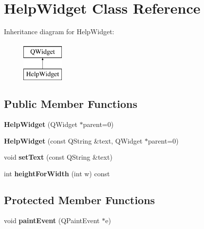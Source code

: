 \hypertarget{class_help_widget}{\section{Help\-Widget Class Reference}
\label{class_help_widget}
}
Inheritance diagram for Help\-Widget\-:\begin{figure}[H]
\begin{center}
\leavevmode
\includegraphics[height=2.000000cm]{class_help_widget}
\end{center}
\end{figure}
\subsection*{Public Member Functions}
\begin{DoxyCompactItemize}
\item 
\hypertarget{class_help_widget_a67b4d660d58cf90ed1d585cce098c910}{{\bfseries Help\-Widget} (Q\-Widget $\ast$parent=0)}\label{class_help_widget_a67b4d660d58cf90ed1d585cce098c910}

\item 
\hypertarget{class_help_widget_a119c4cf249d87bc0280a240d93d10f96}{{\bfseries Help\-Widget} (const Q\-String \&text, Q\-Widget $\ast$parent=0)}\label{class_help_widget_a119c4cf249d87bc0280a240d93d10f96}

\item 
\hypertarget{class_help_widget_a37dd017ab8543bf1a0e2140240d0ad6e}{void {\bfseries set\-Text} (const Q\-String \&text)}\label{class_help_widget_a37dd017ab8543bf1a0e2140240d0ad6e}

\item 
\hypertarget{class_help_widget_aefb13a32d45102f34c4dd7fc10945d59}{int {\bfseries height\-For\-Width} (int w) const }\label{class_help_widget_aefb13a32d45102f34c4dd7fc10945d59}

\end{DoxyCompactItemize}
\subsection*{Protected Member Functions}
\begin{DoxyCompactItemize}
\item 
\hypertarget{class_help_widget_a72250ca3becdb2348a97b84dab79af59}{void {\bfseries paint\-Event} (Q\-Paint\-Event $\ast$e)}\label{class_help_widget_a72250ca3becdb2348a97b84dab79af59}

\end{DoxyCompactItemize}


